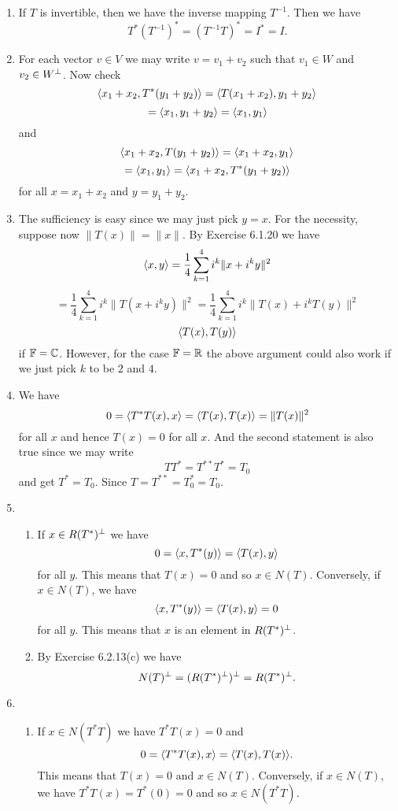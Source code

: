 \begin{enumerate}
\item If $T$ is invertible, then we have the inverse mapping $T^{-1}$. Then we have 
\[T^*(T^{-1})^*=(T^{-1}T)^*=I^*=I.\]
\item For each vector $v\in V$ we may write $v=v_1+v_2$ such that $v_1\in W$ and $v_2\in W^{\perp}$. Now check 
\[\langle x_1+x_2,T^*(y_1+y_2)\rangle =\langle T(x_1+x_2),y_1+y_2\rangle \]
\[=\langle x_1,y_1+y_2\rangle =\langle x_1,y_1 \rangle \]
and 
\[\langle x_1+x_2,T(y_1+y_2)\rangle =\langle x_1+x_2,y_1\rangle \]
\[=\langle x_1,y_1\rangle =\langle x_1+x_2,T^*(y_1+y_2)\rangle \]
for all $x=x_1+x_2$ and $y=y_1+y_2$.
\item The sufficiency is easy since we may just pick $y=x$. For the necessity, suppose now $\|T(x)\|=\|x\|$. By Exercise 6.1.20 we have 
\[\langle x,y\rangle =\frac{1}{4}\sum_{k=1}^4{i^k\|x+i^ky\|^2}\]
\[=\frac{1}{4}\sum_{k=1}^4{i^k\|T(x+i^ky)\|^2}=\frac{1}{4}\sum_{k=1}^4{i^k\|T(x)+i^kT(y)\|^2}\]
\[\langle T(x),T(y)\rangle \]
if $\mathbb{F}=\mathbb{C}$. However, for the case $\mathbb{F}=\mathbb{R}$ the above argument could also work if we just pick $k$ to be $2$ and $4$.
\item We have 
\[0=\langle T^*T(x),x\rangle =\langle T(x),T(x)\rangle =\|T(x)\|^2\]
for all $x$ and hence $T(x)=0$ for all $x$. And the second statement is also true since we may write 
\[TT^*=T^{**}T^*=T_0\]
and get $T^*=T_0$. Since $T=T^{**}=T_0^*=T_0$.
\item \begin{enumerate}
\item If $x\in R(T^*)^{\perp}$ we have 
\[0=\langle x,T^*(y)\rangle =\langle T(x),y\rangle \]
for all $y$. This means that $T(x)=0$ and so $x\in N(T)$. Conversely, if $x\in N(T)$, we have 
\[\langle x,T^*(y)\rangle =\langle T(x),y\rangle =0\]
for all $y$. This means that $x$ is an element in $R(T^*)^{\perp}$.
\item By Exercise 6.2.13(c) we have 
\[N(T)^{\perp} =(R(T^*)^{\perp} )^{\perp} =R(T^*)^{\perp} .\]
\end{enumerate}
\item \begin{enumerate}
\item If $x\in N(T^*T)$ we have $T^*T(x)=0$ and 
\[0=\langle T^*T(x),x\rangle =\langle T(x),T(x)\rangle .\]
This means that $T(x)=0$ and $x\in N(T)$. Conversely, if $x\in N(T)$, we have $T^*T(x)=T^*(0)=0$ and so $x\in N(T^*T)$.


\end{enumerate}
\end{enumerate}
